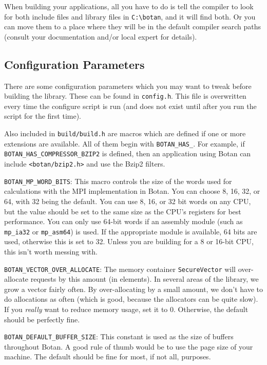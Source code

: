 \documentclass{article}
\newcommand{\filename}[1]{\texttt{#1}}
\newcommand{\module}[1]{\texttt{#1}}
\newcommand{\type}[1]{\texttt{#1}}
\newcommand{\macro}[1]{\texttt{#1}}
\begin{document}
When building your applications, all you have to do is tell the
compiler to look for both include files and library files in
\verb|C:\botan|, and it will find both. Or you can move them to a
place where they will be in the default compiler search paths (consult
your documentation and/or local expert for details).

\pagebreak

\subsection{Configuration Parameters}

There are some configuration parameters which you may want to tweak
before building the library. These can be found in
\filename{config.h}. This file is overwritten every time the configure
script is run (and does not exist until after you run the script for
the first time).

Also included in \filename{build/build.h} are macros which are defined
if one or more extensions are available. All of them begin with
\verb|BOTAN_HAS_|. For example, if \verb|BOTAN_HAS_COMPRESSOR_BZIP2|
is defined, then an application using Botan can include
\filename{<botan/bzip2.h>} and use the Bzip2 filters.

\macro{BOTAN\_MP\_WORD\_BITS}: This macro controls the size of the
words used for calculations with the MPI implementation in Botan. You
can choose 8, 16, 32, or 64, with 32 being the default. You can use 8,
16, or 32 bit words on any CPU, but the value should be set to the
same size as the CPU's registers for best performance. You can only
use 64-bit words if an assembly module (such as \module{mp\_ia32} or
\module{mp\_asm64}) is used. If the appropriate module is available,
64 bits are used, otherwise this is set to 32. Unless you are building
for a 8 or 16-bit CPU, this isn't worth messing with.

\macro{BOTAN\_VECTOR\_OVER\_ALLOCATE}: The memory container
\type{SecureVector} will over-allocate requests by this amount (in
elements). In several areas of the library, we grow a vector fairly often. By
over-allocating by a small amount, we don't have to do allocations as often
(which is good, because the allocators can be quite slow). If you \emph{really}
want to reduce memory usage, set it to 0. Otherwise, the default should be
perfectly fine.

\macro{BOTAN\_DEFAULT\_BUFFER\_SIZE}: This constant is used as the size of
buffers throughout Botan. A good rule of thumb would be to use the page size of
your machine. The default should be fine for most, if not all, purposes.
\end{document}
